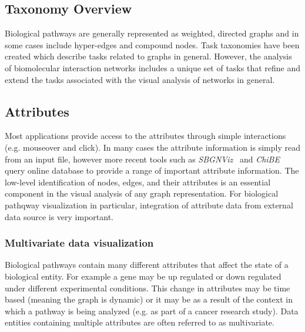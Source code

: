 \documentclass[journal]{vgtc}                %
\begin{document}
\subsection{Taxonomy Overview}

Biological pathways are generally represented as weighted, directed graphs and in some cases include hyper-edges and compound nodes.
Task taxonomies have been created which describe tasks related to graphs in general. However, the analysis of biomolecular interaction networks includes a unique set of tasks that refine and extend the tasks associated with the visual analysis of networks in general.

\subsection{Attributes}


Most applications provide access to the attributes through simple interactions (e.g. mouseover and click). In many cases the attribute information is simply read from an input file, however more recent tools such as \textit{SBGNViz}~\cite{SBGNViz2015} and \textit{ChiBE}\cite{Babur2010chibe} query online database to provide a range of important attribute information.
The low-level identification of nodes, edges, and their attributes is an essential component in the visual analysis of any graph representation. For biological pathqway visualization in particular, integration of attribute data from external data source is very important.

\subsubsection{Multivariate data visualization} %
Biological pathways  contain many different attributes that affect the state of a biological entity. 
For example a gene may be up regulated or down regulated under different experimental conditions. 
This change in attributes may be time based (meaning the graph is dynamic) or it may be as a result of the context in which a pathway is being analyzed (e.g. as part of a cancer research study).
Data entities containing multiple attributes are often referred to as multivariate.
\end{document}
